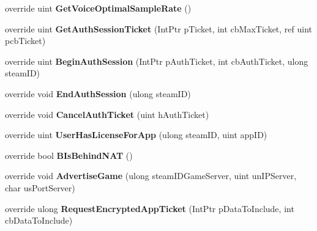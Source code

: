 \begin{DoxyCompactItemize}
override uint {\bfseries Get\+Voice\+Optimal\+Sample\+Rate} ()
\item 
\mbox{\label{class_valve_1_1_steamworks_1_1_c_steam_user_a67bb601b9c856e3cb1bd28a803b18857}} 
override uint {\bfseries Get\+Auth\+Session\+Ticket} (Int\+Ptr p\+Ticket, int cb\+Max\+Ticket, ref uint pcb\+Ticket)
\item 
\mbox{\label{class_valve_1_1_steamworks_1_1_c_steam_user_ab79fc2c8f0496ba038f05652bc36f5ec}} 
override uint {\bfseries Begin\+Auth\+Session} (Int\+Ptr p\+Auth\+Ticket, int cb\+Auth\+Ticket, ulong steam\+ID)
\item 
\mbox{\label{class_valve_1_1_steamworks_1_1_c_steam_user_adbccafcdfbfe71e0a9616017bd77cd34}} 
override void {\bfseries End\+Auth\+Session} (ulong steam\+ID)
\item 
\mbox{\label{class_valve_1_1_steamworks_1_1_c_steam_user_af90f369761d824ba1fb909dbd2508bd6}} 
override void {\bfseries Cancel\+Auth\+Ticket} (uint h\+Auth\+Ticket)
\item 
\mbox{\label{class_valve_1_1_steamworks_1_1_c_steam_user_a4c1e0ad2d6a66c66381a446677748a86}} 
override uint {\bfseries User\+Has\+License\+For\+App} (ulong steam\+ID, uint app\+ID)
\item 
\mbox{\label{class_valve_1_1_steamworks_1_1_c_steam_user_ad96fbcf987252459e5d520239fedb51c}} 
override bool {\bfseries B\+Is\+Behind\+N\+AT} ()
\item 
\mbox{\label{class_valve_1_1_steamworks_1_1_c_steam_user_a45765098145f8be39e449aee794d4f86}} 
override void {\bfseries Advertise\+Game} (ulong steam\+I\+D\+Game\+Server, uint un\+I\+P\+Server, char us\+Port\+Server)
\item 
\mbox{\label{class_valve_1_1_steamworks_1_1_c_steam_user_af1641c9be19e0c15d12d84d71ce20ef2}} 
override ulong {\bfseries Request\+Encrypted\+App\+Ticket} (Int\+Ptr p\+Data\+To\+Include, int cb\+Data\+To\+Include)

\end{DoxyCompactItemize}
